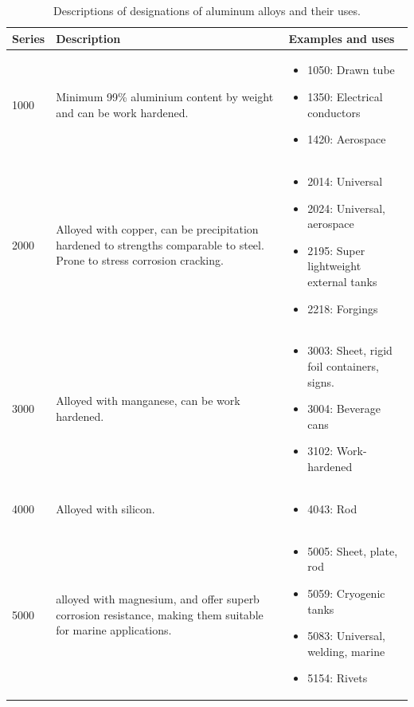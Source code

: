 \documentclass[
10pt,
a4paper,
openany,
svgnames,
]{book}
\begin{document}
\begin{table}[H]
  \caption{Descriptions of designations of aluminum alloys and their uses. \cite{davis2001alloying,grushko2016aluminum}}
  \label{tab: alum alloy description}
  \centering
  \begin{tabular}{lp{6cm}p{6cm}}
    \toprule
    Series & Description & Examples and uses \\
    \midrule
    1000 & Minimum 99\% aluminium content by weight and can be work hardened. & \begin{itemize}
    \item 1050: Drawn tube
    \item 1350: Electrical conductors
    \item 1420: Aerospace
    \end{itemize} \\
    2000 & Alloyed with copper, can be precipitation hardened to strengths comparable to steel. Prone to stress corrosion cracking. & \begin{itemize}
    \item 2014: Universal
    \item 2024: Universal, aerospace
    \item 2195: Super lightweight external tanks
    \item 2218: Forgings 
    \end{itemize} \\
    3000 & Alloyed with manganese, can be work hardened. & \begin{itemize}
    \item 3003: Sheet, rigid foil containers, signs.
    \item 3004: Beverage cans
    \item 3102: Work-hardened
    \end{itemize} \\
    4000 & Alloyed with silicon. & \begin{itemize}
    \item 4043: Rod
    \end{itemize} \\
    5000 & alloyed with magnesium, and offer superb corrosion resistance, making them suitable for marine applications. & \begin{itemize}
    \item 5005: Sheet, plate, rod
    \item 5059: Cryogenic tanks
    \item 5083: Universal, welding, marine
    \item 5154: Rivets

\end{itemize}
\end{tabular}
\end{table}
\end{document}
